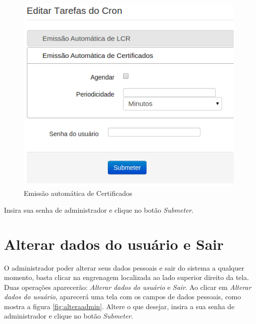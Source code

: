 \begin{figure}[ht]
     \centering
     \includegraphics[scale=0.5]{images/croncert.png}
     \caption{Emissão automática de Certificados}
     \label{fig:croncert}
\end{figure}

Insira sua senha de administrador e clique no botão \textit{Submeter}.

\section{Alterar dados do usuário e Sair}

O administrador poder alterar seus dados pessoais e sair do sistema a qualquer momento, basta clicar na engrenagem localizada ao lado superior direito da tela. Duas operações aparecerão: \textit{Alterar dados do usuário} e \textit{Sair}. Ao clicar em \textit{Alterar dados do usuário}, aparecerá uma tela com os campos de dados pessoais, como mostra a figura \ref{fig:alteraadmin}. Altere o que desejar, insira a sua senha de administrador e clique no botão \emph{Submeter}.

